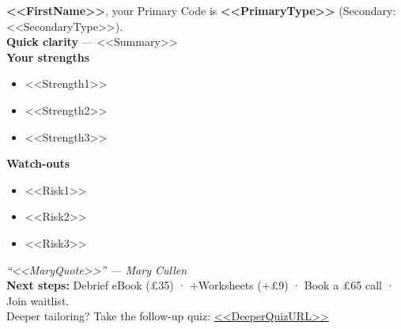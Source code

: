 \textbf{<<FirstName>>}, your Primary Code is \textbf{<<PrimaryType>>} (Secondary: <<SecondaryType>>).\\[3mm]

\textbf{Quick clarity} — <<Summary>>\\[2mm]

\textbf{Your strengths}
\begin{itemize}
  \item <<Strength1>>
  \item <<Strength2>>
  \item <<Strength3>>
\end{itemize}

\textbf{Watch-outs}
\begin{itemize}
  \item <<Risk1>>
  \item <<Risk2>>
  \item <<Risk3>>
\end{itemize}

\emph{“<<MaryQuote>>” — Mary Cullen}\\[2mm]

\textbf{Next steps:} Debrief eBook (£35) · +Worksheets (+£9) · Book a £65 call · Join waitlist.\\
Deeper tailoring? Take the follow-up quiz: \url{<<DeeperQuizURL>>}
